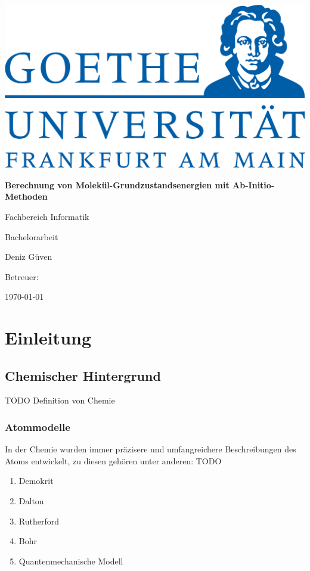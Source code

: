 \documentclass[a4paper, 12pt]{report}
\author{Deniz Güven}
\begin{document}
\begin{titlepage}
  \begin{center}
    \includegraphics[width=0.5\linewidth]{res/uni.png}
    \vspace{2cm}

    \huge{\textbf{Berechnung von Molekül-Grundzustandsenergien 
    mit Ab-Initio-Methoden}}
    \vspace{1cm}

    \Large
    Fachbereich Informatik

    Bachelorarbeit

    Deniz Güven
    \vfill

    Betreuer: 

    \today
  \end{center}
\end{titlepage}

\tableofcontents

\chapter{Einleitung}
\section{Chemischer Hintergrund}

TODO
Definition von Chemie

\subsection{Atommodelle}
In der Chemie wurden immer präzisere 
und umfangreichere Beschreibungen des Atoms entwickelt,
zu diesen gehören unter anderen:
TODO
\begin{enumerate}
  \item Demokrit
  \item Dalton
  \item Rutherford
  \item Bohr
  \item Quantenmechanische Modell
\end{enumerate}
\end{document}

